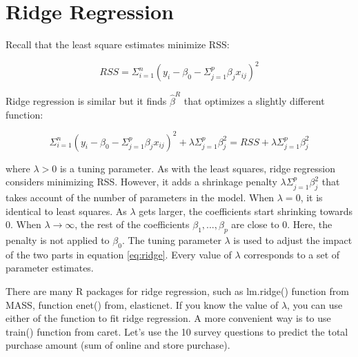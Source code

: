 \documentclass[12pt,]{krantz}
\makeatletter
\newenvironment{Shaded}{\begin{snugshade}}{\end{snugshade}}
\newcommand{\CommentTok}[1]{\textcolor[rgb]{0.37,0.37,0.37}{\textit{#1}}}
\newcommand{\ControlFlowTok}[1]{\textcolor[rgb]{0.27,0.27,0.27}{\textbf{#1}}}
\newcommand{\DataTypeTok}[1]{\textcolor[rgb]{0.27,0.27,0.27}{#1}}
\newcommand{\DecValTok}[1]{\textcolor[rgb]{0.06,0.06,0.06}{#1}}
\newcommand{\KeywordTok}[1]{\textcolor[rgb]{0.27,0.27,0.27}{\textbf{#1}}}
\newcommand{\NormalTok}[1]{#1}
\newcommand{\OperatorTok}[1]{\textcolor[rgb]{0.43,0.43,0.43}{\textbf{#1}}}
\newcommand{\OtherTok}[1]{\textcolor[rgb]{0.37,0.37,0.37}{#1}}
\newcommand{\StringTok}[1]{\textcolor[rgb]{0.5,0.5,0.5}{#1}}
\newenvironment{kframe}{%
\medskip{}
\setlength{\fboxsep}{.8em}
 \def\at@end@of@kframe{}%
 \ifinner\ifhmode%
  \def\at@end@of@kframe{\end{minipage}}%
  \begin{minipage}{\columnwidth}%
 \fi\fi%
 \def\FrameCommand##1{\hskip\@totalleftmargin \hskip-\fboxsep
 \colorbox{shadecolor}{##1}\hskip-\fboxsep
     \hskip-\linewidth \hskip-\@totalleftmargin \hskip\columnwidth}%
 \MakeFramed {\advance\hsize-\width
   \@totalleftmargin\z@ \linewidth\hsize
   \@setminipage}}%
 {\par\unskip\endMakeFramed%
 \at@end@of@kframe}
\renewenvironment{Shaded}{\begin{kframe}}{\end{kframe}}
\makeatother
\begin{document}
\hypertarget{ridge-regression}{%
\section{Ridge Regression}\label{ridge-regression}}

Recall that the least square estimates minimize RSS:

\[RSS=\Sigma_{i=1}^{n}(y_{i}-\beta_{0}-\Sigma_{j=1}^{p}\beta_{j}x_{ij})^{2}\]

Ridge regression \citep{Hoerl1970} is similar but it finds \(\hat{\beta}^{R}\) that optimizes a slightly different function:

\begin{equation}
\Sigma_{i=1}^{n}(y_{i}-\beta_{0}-\Sigma_{j=1}^{p}\beta_{j}x_{ij})^{2}+\lambda\Sigma_{j=1}^{p}\beta_{j}^{2}=RSS+\lambda\Sigma_{j=1}^{p}\beta_{j}^{2}
\label{eq:ridge}
\end{equation}

where \(\lambda >0\) is a tuning parameter. As with the least squares, ridge regression considers minimizing RSS. However, it adds a shrinkage penalty \(\lambda\Sigma_{j=1}^{p}\beta_{j}^{2}\) that takes account of the number of parameters in the model. When \(\lambda = 0\), it is identical to least squares. As \(\lambda\) gets larger, the coefficients start shrinking towards 0. When \(\lambda\rightarrow\infty\), the rest of the coefficients \(\beta_{1},...,\beta_{p}\) are close to 0. Here, the penalty is not applied to \(\beta_{0}\). The tuning parameter \(\lambda\) is used to adjust the impact of the two parts in equation \eqref{eq:ridge}. Every value of \(\lambda\) corresponds to a set of parameter estimates.

There are many R packages for ridge regression, such as lm.ridge() function from MASS, function enet() from, elasticnet. If you know the value of \(\lambda\), you can use either of the function to fit ridge regression. A more convenient way is to use train() function from caret. Let's use the 10 survey questions to predict the total purchase amount (sum of online and store purchase).

\begin{Shaded}
\end{Shaded}
\end{document}
